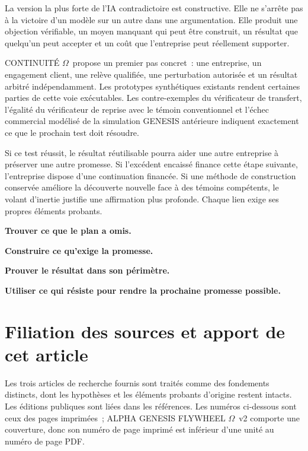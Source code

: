 \documentclass[11pt,a4paper]{article}
\newcommand{\om}{CONTINUITÉ $\Omega$}
\newcommand{\genesis}{ALPHA GENESIS FLYWHEEL $\Omega$}
\newcommand{\chapterpage}{\clearpage}
\begin{document}
La version la plus forte de l’IA contradictoire est constructive. Elle ne s’arrête pas à la victoire d’un modèle sur un autre dans une argumentation. Elle produit une objection vérifiable, un moyen manquant qui peut être construit, un résultat que quelqu’un peut accepter et un coût que l’entreprise peut réellement supporter.

\om\ propose un premier pas concret~: une entreprise, un engagement client, une relève qualifiée, une perturbation autorisée et un résultat arbitré indépendamment. Les prototypes synthétiques existants rendent certaines parties de cette voie exécutables. Les contre-exemples du vérificateur de transfert, l’égalité du vérificateur de reprise avec le témoin conventionnel et l’échec commercial modélisé de la simulation GENESIS antérieure indiquent exactement ce que le prochain test doit résoudre.

Si ce test réussit, le résultat réutilisable pourra aider une autre entreprise à préserver une autre promesse. Si l’excédent encaissé finance cette étape suivante, l’entreprise dispose d’une continuation financée. Si une méthode de construction conservée améliore la découverte nouvelle face à des témoins compétents, le volant d’inertie justifie une affirmation plus profonde. Chaque lien exige ses propres éléments probants.

\begin{insight}
\large\textbf{Trouver ce que le plan a omis.}\par
\textbf{Construire ce qu’exige la promesse.}\par
\textbf{Prouver le résultat dans son périmètre.}\par
\textbf{Utiliser ce qui résiste pour rendre la prochaine promesse possible.}
\end{insight}

\chapterpage
\appendix
\section{Filiation des sources et apport de cet article}\label{app:lineage}
Les trois articles de recherche fournis sont traités comme des fondements distincts, dont les hypothèses et les éléments probants d’origine restent intacts. Les éditions publiques sont liées dans les références. Les numéros ci-dessous sont ceux des pages imprimées~; \genesis\ v2 comporte une couverture, donc son numéro de page imprimé est inférieur d’une unité au numéro de page PDF.
\end{document}
